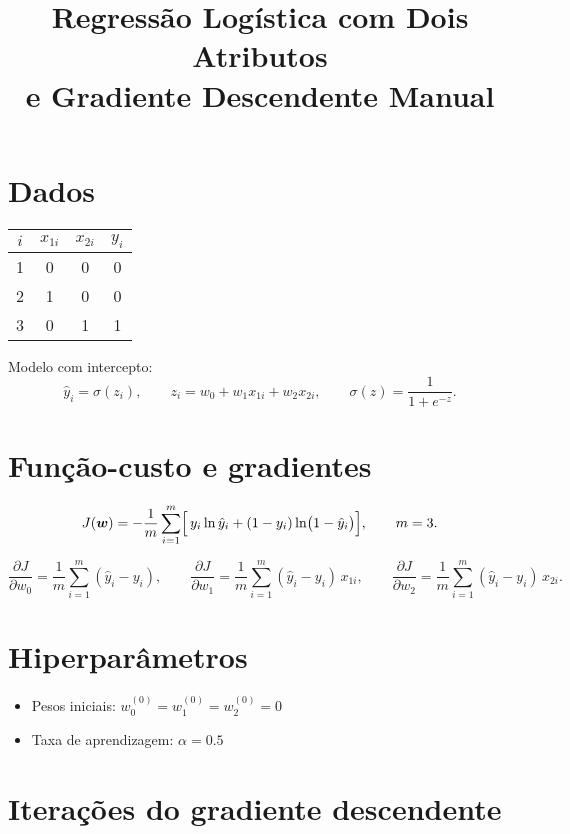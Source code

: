 \documentclass[12pt]{article}
\title{Regressão Logística com Dois Atributos \\ e Gradiente Descendente Manual}
\author{}
\date{}
\begin{document}
\maketitle

\section{Dados}

\begin{center}
\begin{tabular}{cccc}
\toprule
$i$ & $x_{1i}$ & $x_{2i}$ & $y_i$\\
\midrule
1 & 0 & 0 & 0\\
2 & 1 & 0 & 0\\
3 & 0 & 1 & 1\\
\bottomrule
\end{tabular}
\end{center}

\bigskip
\noindent
Modelo com intercepto:
\[
\hat{y}_i = \sigma(z_i),\qquad
z_i = w_0 + w_1 x_{1i} + w_2 x_{2i},\qquad
\sigma(z) = \frac{1}{1 + e^{-z}}.
\]

\section{Função-custo e gradientes}

\[
J(\bm w) = -\frac{1}{m}\sum_{i=1}^{m}
\Bigl[\,y_i \ln \hat{y}_i + (1-y_i) \ln\bigl(1-\hat{y}_i\bigr)\Bigr],
\qquad m = 3.
\]

\[
\frac{\partial J}{\partial w_0} = \frac{1}{m}\sum_{i=1}^{m}(\hat{y}_i - y_i),
\qquad
\frac{\partial J}{\partial w_1} = \frac{1}{m}\sum_{i=1}^{m}(\hat{y}_i - y_i)\,x_{1i},
\qquad
\frac{\partial J}{\partial w_2} = \frac{1}{m}\sum_{i=1}^{m}(\hat{y}_i - y_i)\,x_{2i}.
\]

\section{Hiperparâmetros}

\begin{itemize}
  \item Pesos iniciais: $w_0^{(0)} = w_1^{(0)} = w_2^{(0)} = 0$
  \item Taxa de aprendizagem: $\alpha = 0.5$
\end{itemize}

\section{Iterações do gradiente descendente}
\end{document}
